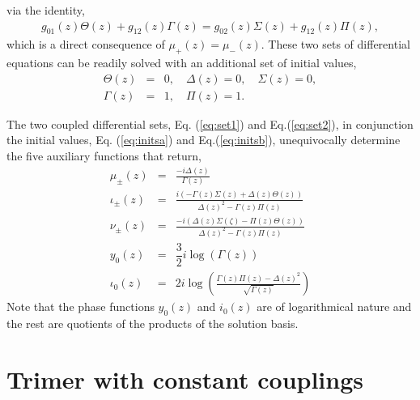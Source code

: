 \documentclass[9pt,twocolumn,twoside]{osajnl}
\begin{document}
via the identity, 
\begin{eqnarray}
g_{01}(z)\Theta(z) + g_{12}(z) \Gamma(z) =  g_{02}(z) \Sigma (z) + g_{12}(z) \Pi (z),
\end{eqnarray}
which is a direct consequence of $\mu_{+}(z)=\mu_{-}(z)$.
These two sets of differential equations can be readily solved with an additional set of initial values,
\begin{eqnarray}
\Theta(z)&=& 0 , \quad \Delta(z) =  0, \quad \Sigma(z)= 0,   \label{eq:initsa} \\
\Gamma(z)&=& 1, \quad \Pi(z)= 1. \label{eq:initsb}
\end{eqnarray}



The two coupled differential sets, Eq. (\ref{eq:set1}) and Eq.(\ref{eq:set2}), in conjunction the initial values, Eq. (\ref{eq:initsa}) and Eq.(\ref{eq:initsb}), 
unequivocally determine the five auxiliary functions that return, 
\begin{eqnarray}
\mu_{\pm}(z) &=& \frac{-i \Delta(z)}{\Gamma(z)} \\
\iota_{\pm}(z) &=& \frac{i(-\Gamma(z)\Sigma(z)+\Delta(z)\Theta(z))}{\Delta(z)^2-\Gamma(z)\Pi(z)}\\
\nu_{\pm}(z) &=& \frac{-i(\Delta(z)\Sigma(\zeta)-\Pi(z)\Theta(z))}{\Delta(z)^2-\Gamma(z)\Pi(z)}\\
y_0(z) &=&  \dfrac{3}{2} i \log (\Gamma(z))\label{eq:yzeto}\\
\iota_0(z) &=& 2 i \log (\frac{\Gamma(z)\Pi(z)-\Delta(z)^2}{\sqrt{\Gamma(z)}}) \label{eq:izero}
\end{eqnarray}
Note that the phase functions $y_0(z)$ and $i_0(z)$ are of logarithmical nature and the rest are quotients of the products of the solution basis. 


\section{Trimer with constant couplings}
\end{document}
